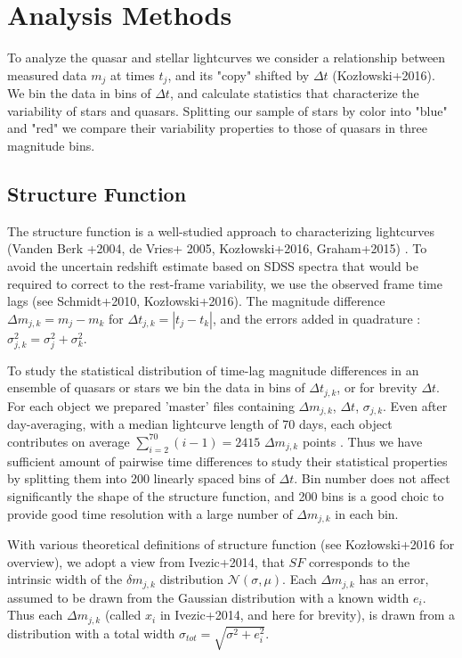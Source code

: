\documentclass[fleqn,usenatbib]{mnras}  %
\begin{document}
\section{Analysis Methods}
To analyze the quasar and stellar lightcurves we consider a relationship between measured data $m_{j}$  at times $t_{j}$, and its "copy" shifted by $\Delta  t$ (Koz\l{}owski+2016). We bin the data in bins of $\Delta t$, and calculate statistics that characterize  the variability of stars and quasars. Splitting our sample of stars by color into "blue" and "red" we compare their variability properties to those of quasars in three magnitude bins.

\subsection{Structure Function}
The structure function is a well-studied approach to characterizing lightcurves (Vanden Berk +2004,  de Vries+ 2005, Koz\l{}owski+2016, Graham+2015) . To avoid the uncertain redshift estimate based on SDSS spectra that would be required to correct to the rest-frame variability, we use the observed frame time lags (see Schmidt+2010, Koz\l{}owski+2016).   The  magnitude difference $\Delta m_{j,k} = m_{j} - m_{k}$ for $\Delta t_{j,k} = |t_{j} - t_{k}|$, and the errors added in quadrature :  $\sigma_{j,k}^{2} = \sigma_{j}^{2} + \sigma_{k}^{2}$. 

To study the statistical distribution of time-lag magnitude differences in an ensemble of quasars or stars we bin the data in bins of $\Delta t_{j,k} $, or for brevity  $\Delta t$. For each object  we prepared 'master' files containing $\Delta m_{j,k}$, $\Delta t$, $\sigma_{j,k}$. Even after day-averaging, with a median lightcurve length of 70 days, each object contributes on average $\sum_{i=2}^{70}{(i-1)} = 2415$  $\Delta m_{j,k}$ points . Thus we have sufficient amount of pairwise time differences to study their statistical properties by splitting them into 200 linearly spaced bins of  $\Delta t$. Bin number does not affect significantly the shape of the structure function, and 200 bins is a good choic to provide good  time resolution with a large number of  $\Delta m_{j,k}$ in each bin.

With  various theoretical definitions of structure function (see Koz\l{}owski+2016 for overview), we adopt a view from Ivezic+2014, that $SF$ corresponds to the intrinsic width of the $\delta m_{j,k}$ distribution  $\mathcal{N}(\sigma,\mu)$. Each $\Delta m_{j,k}$ has an error, assumed to be drawn from the Gaussian distribution with a known width $e_{i}$. Thus each $\Delta m_{j,k}$ (called $x_{i}$ in Ivezic+2014, and here for brevity), is drawn from a distribution  with a total width $\sigma_{tot} = \sqrt{\sigma^{2} + e_{i}^{2}}$. 
\end{document}
